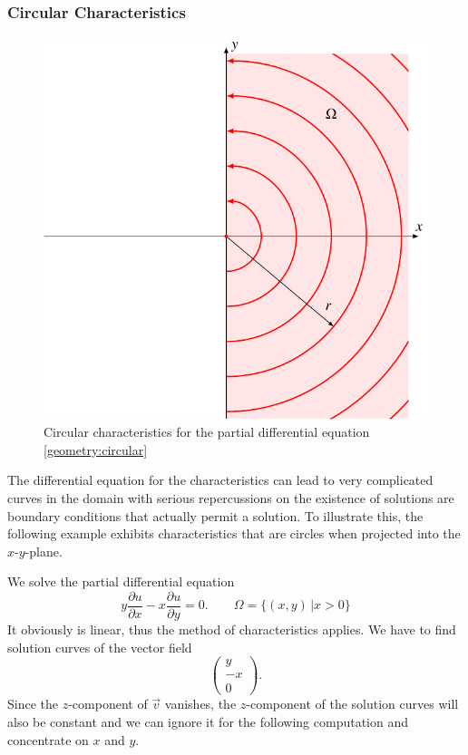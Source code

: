 \subsubsection{Circular Characteristics}
\begin{figure}
\centering
\includegraphics{3-geometry/images/circular.pdf}
\caption{Circular characteristics for the partial differential equation
\eqref{geometry:circular}
\label{gemoetry:circular:image}
}
\end{figure}
The differential equation for the characteristics can lead to very 
complicated curves in the domain with serious repercussions on the
existence of solutions are boundary conditions that actually permit
a solution.
To illustrate this, the following example exhibits characteristics that
are circles when projected into the $x$-$y$-plane.

We solve the partial differential equation
\begin{equation}
y\frac{\partial u}{\partial x}-x\frac{\partial u}{\partial y}=0.
\qquad\Omega=\{(x,y)\,|x>0\}
\label{geometry:circular}
\end{equation}
It obviously is linear, thus the method of characteristics applies.
We have to find solution curves of the vector field
\[
\begin{pmatrix}
y\\-x\\0
\end{pmatrix}.
\]
Since the $z$-component of $\vec{v}$ vanishes, the $z$-component of the
solution curves will also be constant and we can ignore it for the
following computation and concentrate on $x$ and $y$.


